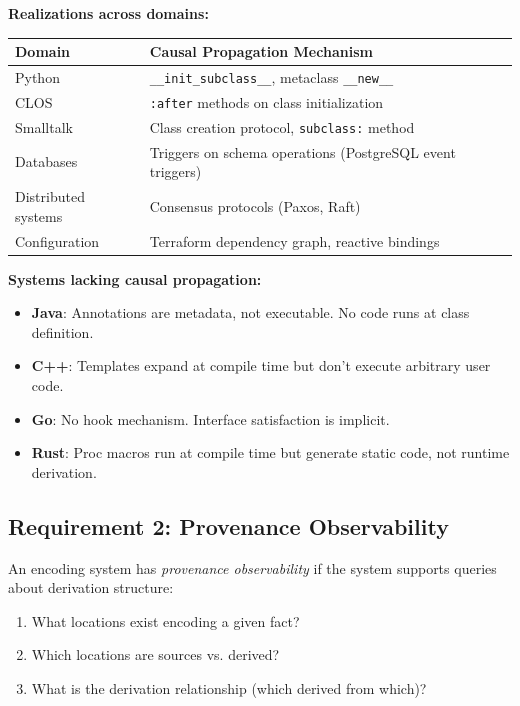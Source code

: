 \textbf{Realizations across domains:}

\begin{center}
\begin{tabularx}{\linewidth}{lX}
\toprule
\textbf{Domain} & \textbf{Causal Propagation Mechanism} \\
\midrule
Python & \texttt{\_\_init\_subclass\_\_}, metaclass \texttt{\_\_new\_\_} \\
CLOS & \texttt{:after} methods on class initialization \\
Smalltalk & Class creation protocol, \texttt{subclass:} method \\
Databases & Triggers on schema operations (PostgreSQL event triggers) \\
Distributed systems & Consensus protocols (Paxos, Raft) \\
Configuration & Terraform dependency graph, reactive bindings \\
\bottomrule
\end{tabularx}
\end{center}

\textbf{Systems lacking causal propagation:}
\begin{itemize}
\tightlist
\item \textbf{Java}: Annotations are metadata, not executable. No code runs at class definition.
\item \textbf{C++}: Templates expand at compile time but don't execute arbitrary user code.
\item \textbf{Go}: No hook mechanism. Interface satisfaction is implicit.
\item \textbf{Rust}: Proc macros run at compile time but generate static code, not runtime derivation.
\end{itemize}

\subsection{Requirement 2: Provenance Observability}\label{sec:provenance-observability}

\begin{definition}\label{def:provenance-observability}
An encoding system has \emph{provenance observability} if the system supports queries about derivation structure:
\begin{enumerate}
\tightlist
\item What locations exist encoding a given fact?
\item Which locations are sources vs. derived?
\item What is the derivation relationship (which derived from which)?
\end{enumerate}
\end{definition}

